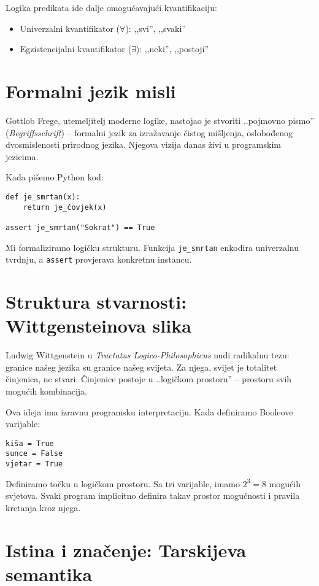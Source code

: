 Logika predikata ide dalje omogućavajući kvantifikaciju:
\begin{itemize}
\item Univerzalni kvantifikator ($\forall$): ,,svi'', ,,svaki''
\item Egzistencijalni kvantifikator ($\exists$): ,,neki'', ,,postoji''
\end{itemize}


\section{Formalni jezik misli}


Gottlob Frege, utemeljitelj moderne logike, nastojao je stvoriti ..pojmovno pismo'' (\textit{Begriffsschrift}) -- formalni jezik za izražavanje čistog mišljenja, oslobođenog dvosmislenosti prirodnog jezika. Njegova vizija danas živi u programskim jezicima.


Kada pišemo Python kod:
\begin{verbatim}
def je_smrtan(x):
    return je_čovjek(x)

assert je_smrtan("Sokrat") == True
\end{verbatim}


Mi formaliziramo logičku strukturu. Funkcija \texttt{je\_smrtan} enkodira univerzalnu tvrdnju, a \texttt{assert} provjerava konkretnu instancu.


\section{Struktura stvarnosti: Wittgensteinova slika}


Ludwig Wittgenstein u \textit{Tractatus Logico-Philosophicus} nudi radikalnu tezu: granice našeg jezika su granice našeg svijeta. Za njega, svijet je totalitet činjenica, ne stvari. Činjenice postoje u ..logičkom prostoru'' -- prostoru svih mogućih kombinacija.


Ova ideja ima izravnu programsku interpretaciju. Kada definiramo Booleove varijable:
\begin{verbatim}
kiša = True
sunce = False
vjetar = True
\end{verbatim}


Definiramo točku u logičkom prostoru. Sa tri varijable, imamo $2^3 = 8$ mogućih svjetova. Svaki program implicitno definira takav prostor mogućnosti i pravila kretanja kroz njega.


\section{Istina i značenje: Tarskijeva semantika}


